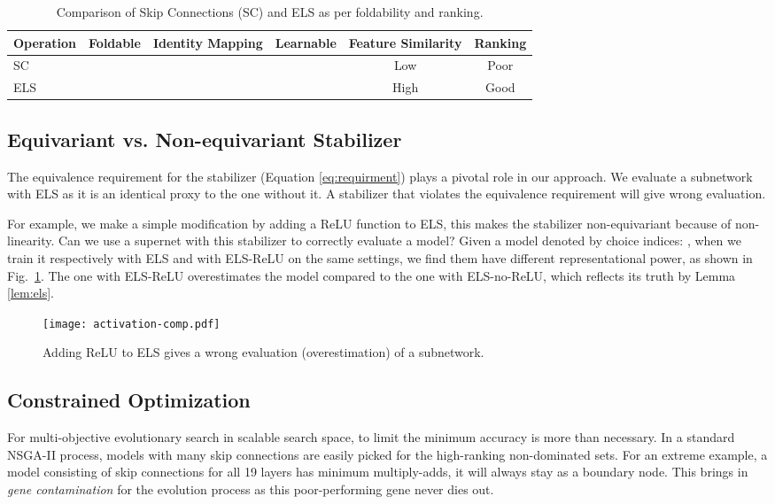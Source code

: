 \documentclass[runningheads]{llncs}
\newcommand{\cmark}{\ding{51}}\newcommand{\xmark}{\ding{55}}
\begin{document}
\setlength{\tabcolsep}{4pt}
\begin{table}
	\caption{Comparison of Skip Connections (SC) and ELS as per foldability and ranking.} \centering
	\begin{tabular} {|l*{5}{|c}|}
		\hline
		Operation  & Foldable & Identity Mapping  & Learnable &  Feature Similarity & Ranking \\
		\hline
		SC  & \cmark & \cmark & \xmark & Low & Poor\\
		ELS  & \cmark & \cmark & \cmark & High & Good\\
		\hline
	\end{tabular}
	\label{tab:comp-sc-els}
\end{table}


\subsection{Equivariant vs. Non-equivariant Stabilizer}

The equivalence requirement for the stabilizer (Equation \ref{eq:requirment}) plays a pivotal role in our approach. We evaluate a subnetwork with ELS as it is an identical proxy to the one without it. A stabilizer that violates the equivalence requirement will give wrong evaluation. 

For example, we make a simple modification by adding a ReLU function to ELS, this makes the stabilizer non-equivariant because of non-linearity. Can we use a supernet with this stabilizer to correctly evaluate a model? Given a model denoted by choice indices: ,  when we train it respectively with ELS and with ELS-ReLU on the same settings, we find them have different representational power, as shown in Fig.~\ref{fig:activation-comp}. The one with ELS-ReLU overestimates the model compared to the one with ELS-no-ReLU, which reflects its truth by Lemma \ref{lem:els}. 

\begin{figure}[ht]
	\centering
	\texttt{[image: activation-comp.pdf]}
	\caption{Adding ReLU to ELS gives a wrong evaluation (overestimation) of a subnetwork.}
	\label{fig:activation-comp}
\end{figure}


\subsection{Constrained Optimization}

For multi-objective evolutionary search in scalable search space, to limit the minimum accuracy is more than necessary. In a standard NSGA-II \cite{deb2002fast} process, models with many skip connections are easily picked for the high-ranking non-dominated sets. For an extreme example, a model consisting of skip connections for all 19 layers has minimum multiply-adds, it will always stay as a boundary node. This brings in \emph{gene contamination} for the evolution process as this poor-performing gene never dies out.
\end{document}
